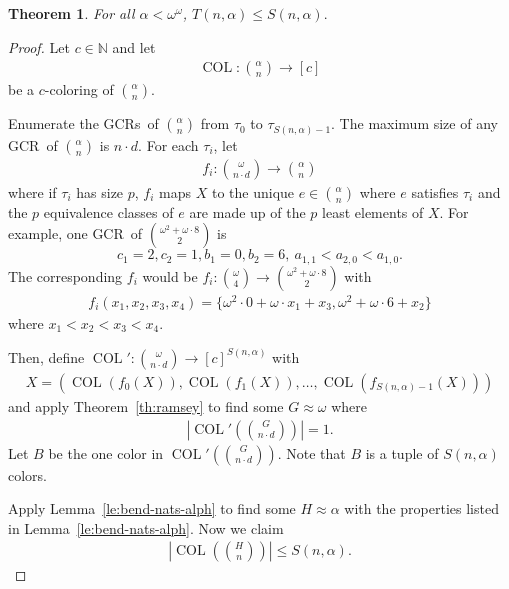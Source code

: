 \documentclass[10pt,a4paper]{article}
\newcommand{\om}{\omega}
\newcommand{\oequiv}{\approx}
\newcommand{\COL}{\operatorname{COL}}
\newcommand{\N}{\mathbb{N}}
\newcommand{\gencrulenospace}{GCR}
\newcommand{\gencrule}{\gencrulenospace~}
\newcommand{\gencrules}{\gencrulenospace s~}
\newcommand{\numpoints}{n}
\newcommand{\numcolors}{c}
\newcommand{\commonconst}{a}
\newcommand{\rareconst}{b}
\newcommand{\Rareconst}{B}
\theoremstyle{plain}
\newtheorem{theorem}{Theorem}[section]
\theoremstyle{definition}
\begin{document}
\begin{theorem}
    \label{th:alph-GT}
    For all $\alpha < \om^\om$,
        $T\left(\numpoints, \alpha\right) \leq S\left(\numpoints, \alpha\right).$
\end{theorem}
\begin{proof}
Let $\numcolors \in \N$ and let \begin{align*}
    \COL \colon \binom{\alpha}{\numpoints} \to [\numcolors]
\end{align*}
be a $\numcolors$-coloring of $\binom{\alpha}{\numpoints}$.

Enumerate the \gencrules of $\binom{\alpha}{\numpoints}$ from $\tau_0$ to $\tau_{S(\numpoints, \alpha)-1}$. The maximum size of any \gencrule of $\binom{\alpha}{\numpoints}$ is $\numpoints \cdot d$. For each $\tau_i$, let \begin{align*}
    f_i \colon \binom{\om}{\numpoints \cdot d} \to \binom{\alpha}{\numpoints}
\end{align*}
where if $\tau_i$ has size $p$, $f_i$ maps $X$ to the unique $e \in \binom{\alpha}{\numpoints}$
where $e$ satisfies $\tau_i$ and the $p$ equivalence classes of $e$ are made up of the $p$ least elements of $X$. For example, one \gencrule of $\binom{\om^2 + \om\cdot 8}{2}$ is $$
c_1=2,c_2=1,\rareconst_1=0,\rareconst_2=6,~\commonconst_{1, 1} < \commonconst_{2, 0} < \commonconst_{1, 0}.
$$ The corresponding $f_i$ would be $f_i \colon \binom{\om}{4} \to \binom{\om^2 + \om\cdot 8}{2}$ with \begin{align*}
f_i(x_1,x_2,x_3,x_4) = \{\om^2 \cdot 0 + \om \cdot x_1 + x_3, \om^2 + \om \cdot 6 + x_2\}
\end{align*} where $x_1 < x_2 < x_3 < x_4$.

Then, define $\COL' \colon \binom{\om}{\numpoints \cdot d} \to [\numcolors]^{S(\numpoints, \alpha)}$ with \begin{align*}
    X = (\COL(f_0(X)),\COL(f_1(X)),\ldots,\COL(f_{S(\numpoints, \alpha)-1}(X)))
\end{align*}
and apply Theorem~\ref{th:ramsey} to find some $G \oequiv \om$ where
\begin{align*}
\left | \COL' \left( \binom{G}{\numpoints \cdot d} \right)\right | = 1.
\end{align*}
Let $\Rareconst$ be the one color in $\COL'\left(\binom{G}{\numpoints\cdot d}\right)$.
Note that $\Rareconst$ is a tuple of $S(\numpoints, \alpha)$ colors.

Apply Lemma~\ref{le:bend-nats-alph} to find some
$H \oequiv \alpha$ with the properties listed in Lemma~\ref{le:bend-nats-alph}. Now we claim 
\begin{align*}
    \left | \COL \left( \binom{H}{\numpoints} \right)\right | \leq 
S(\numpoints, \alpha).
\end{align*}


\end{proof}
\end{document}
